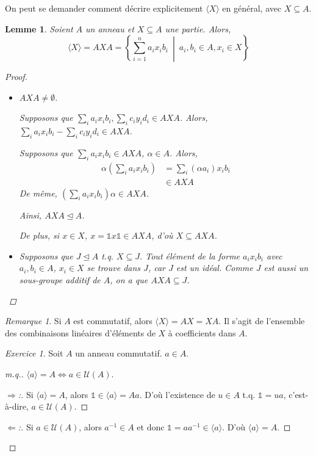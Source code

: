 \documentclass{report}
\newtheorem*{lem}{Lemme}
\theoremstyle{definition}
\theoremstyle{remark}
\newtheorem*{exer}{Exercice}
\newtheorem*{rmq}{Remarque}
\newenvironment*{subproof}[1][D\'emonstration]
{
\begin{proof}[#1]

}
{
\renewcommand{\qedsymbol}{$\blacksquare$}
\end{proof}
\renewcommand{\qedsymbol}{$\square$}
}
\def\id{\mathds{1}}
\begin{document}
	On peut se demander comment d\'ecrire explicitement $\langle X \rangle$ en g\'en\'eral, avec $X \subseteq A$.

	\begin{lem}
		Soient $A$ un anneau et $X\subseteq A$ une partie. Alors, \[\langle X \rangle = AXA = \left\{ \sum_{i=1}^{n}a_ix_ib_i ~\middle|~ a_i,b_i\in A, x_i\in X \right\} \]
		\begin{proof}
			\begin{itemize}
				\item $AXA\neq\emptyset$.

				Supposons que $\sum_i a_ix_ib_i, \sum_i c_iy_id_i \in AXA$. Alors, $\sum_i a_ix_ib_i - \sum_i c_iy_id_i \in AXA$.

				Supposons que $\sum_i a_ix_ib_i \in AXA$, $\alpha \in A$. Alors,
				\begin{align*}
					\alpha\left(\sum_i a_ix_ib_i\right)&= \sum_i (\alpha a_i)x_ib_i\\
					&\in AXA
				\end{align*}
				De m\^eme, $\left(\sum_ia_ix_ib_i\right)\alpha\in AXA$.

				Ainsi, $AXA\trianglelefteq A$.

				De plus, si $x\in X$, $x=\id x\id\in AXA$, d'o\`u $X\subseteq AXA$.
				\item Supposons que $J\trianglelefteq A$ t.q. $X\subseteq J$. Tout \'el\'ement de la forme $a_ix_ib_i$ avec $a_i,b_i\in A$, $x_i\in X$ se trouve dans $J$, car $J$ est un id\'eal. Comme $J$ est aussi un sous-groupe additif de $A$, on a que $AXA \subseteq J$.
			\end{itemize}
		\end{proof}
	\end{lem}

	\begin{rmq}
		Si $A$ est commutatif, alors $\langle X \rangle = AX = XA$. Il s'agit de l'ensemble des combinaisons lin\'eaires d'\'el\'ements de $X$ \`a coefficients dans $A$.
	\end{rmq}

	\begin{exer}
		Soit $A$ un anneau commutatif. $a \in A$.
		\begin{proof}[m.q.]
			$\langle a \rangle = A \Longleftrightarrow a\in \mathcal{U}(A)$.
			\begin{subproof}[$\Rightarrow$:]
				Si $\langle a \rangle = A$, alors $\id\in\langle a\rangle=Aa$. D'o\`u l'existence de $u\in A$ t.q. $\id=ua$, c'est-\`a-dire, $a\in\mathcal{U}(A)$.
			\end{subproof}
			\begin{subproof}[$\Leftarrow$:]
				Si $a\in\mathcal{U}(A)$, alors $a^{-1}\in A$ et donc $\id=aa^{-1}\in\langle a\rangle$. D'o\`u $\langle a\rangle=A$.
			\end{subproof}
		\end{proof}
	\end{exer}
\end{document}
